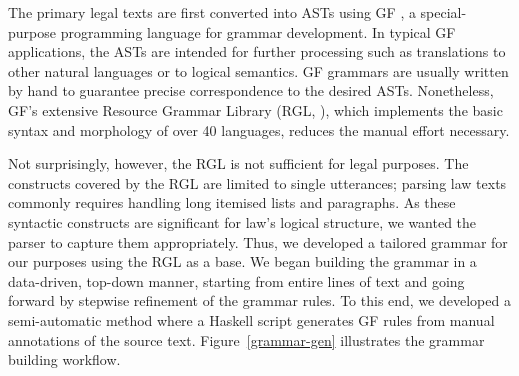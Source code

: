\documentclass{IOS-Book-Article}
\begin{document}
The primary legal texts are first converted into ASTs using GF \cite{ranta-2011}, a special-purpose programming language for grammar development. 
In typical GF applications, the ASTs are intended for further processing such as translations to other natural languages or to logical semantics.
GF grammars are usually written by hand to guarantee precise correspondence to the desired ASTs.
Nonetheless, GF's extensive Resource Grammar Library (RGL, \cite{ranta-2009}), which implements the basic syntax and morphology of over 40 languages, reduces the manual effort necessary.

Not surprisingly, however, the RGL is not sufficient for legal purposes. The constructs covered by the RGL are limited to single utterances; parsing law texts commonly requires handling long itemised lists and paragraphs. As these syntactic constructs are significant for law's logical structure, we wanted the parser to capture them appropriately.
Thus, we developed a tailored grammar for our purposes using the RGL as a base.
We began building the grammar in a data-driven, top-down manner, starting from entire lines of text and going forward by stepwise refinement of the grammar rules.
To this end, we developed a semi-automatic method where a Haskell script generates GF rules from manual annotations of the source text.
Figure~\ref{grammar-gen} illustrates the grammar building workflow.
\end{document}
